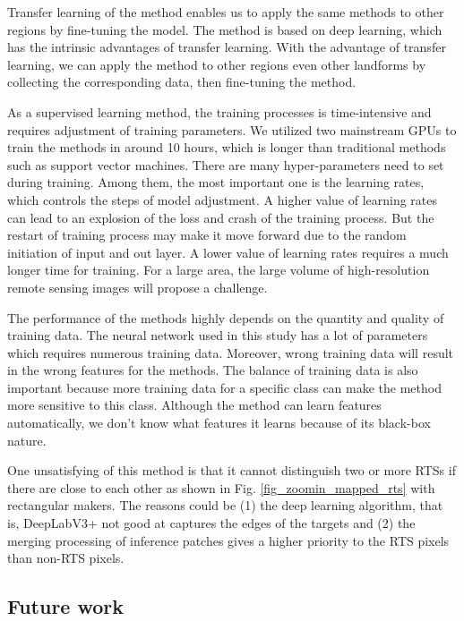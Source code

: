 \documentclass[preprint,12pt,authoryear]{elsarticle}
\begin{document}
Transfer learning of the method enables us to apply the same methods to other regions by fine-tuning the model. The method is based on deep learning, which has the intrinsic advantages of transfer learning. With the advantage of transfer learning, we can apply the method to other regions even other landforms by collecting the corresponding data, then fine-tuning the method. 

As a supervised learning method, the training processes is time-intensive and requires adjustment of training parameters. We utilized two mainstream GPUs to train the methods in around 10 hours, which is longer than traditional methods such as support vector machines. There are many hyper-parameters need to set during training. Among them, the most important one is the learning rates, which controls the steps of model adjustment. A higher value of learning rates can lead to an explosion of the loss and crash of the training process. But the restart of training process may make it move forward due to the random initiation of input and out layer. A lower value of learning rates requires a much longer time for training. For a large area, the large volume of high-resolution remote sensing images will propose a challenge.

The performance of the methods highly depends on the quantity and quality of training data. The neural network used in this study has a lot of parameters which requires numerous training data. Moreover, wrong training data will result in the wrong features for the methods. The balance of training data is also important because more training data for a specific class can make the method more sensitive to this class. Although the method can learn features automatically, we don’t know what features it learns because of its black-box nature. 

One unsatisfying of this method is that it cannot distinguish two or more RTSs if there are close to each other as shown in Fig. \ref{fig_zoomin_mapped_rts} with rectangular makers. The reasons could be (1) the deep learning algorithm, that is, DeepLabV3+ not good at captures the edges of the targets and (2) the merging processing of inference patches gives a higher priority to the RTS pixels than non-RTS pixels.

\subsection{Future work}
\label{subsec_future}
\end{document}

